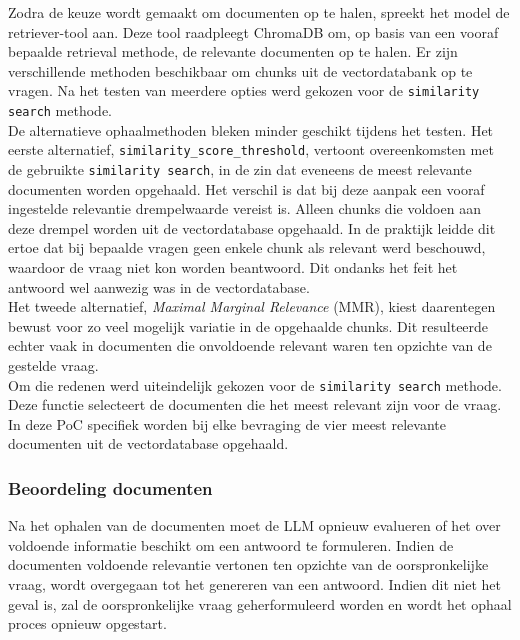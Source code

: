 Zodra de keuze wordt gemaakt om documenten op te halen, spreekt het model de retriever-tool aan. Deze tool raadpleegt ChromaDB om, op basis van een vooraf bepaalde retrieval methode, de relevante documenten op te halen. Er zijn verschillende methoden beschikbaar om chunks uit de vectordatabank op te vragen. Na het testen van meerdere opties werd gekozen voor de \verb|similarity search| methode.
\\[1em]
De alternatieve ophaalmethoden bleken minder geschikt tijdens het testen. Het eerste alternatief, \verb|similarity_score_threshold|, vertoont overeenkomsten met de gebruikte \verb|similarity search|, in de zin dat eveneens de meest relevante documenten worden opgehaald. Het verschil is dat bij deze aanpak een vooraf ingestelde relevantie drempelwaarde vereist is. Alleen chunks die voldoen aan deze drempel worden uit de vectordatabase opgehaald. In de praktijk leidde dit ertoe dat bij bepaalde vragen geen enkele chunk als relevant werd beschouwd, waardoor de vraag niet kon worden beantwoord. Dit ondanks het feit het antwoord wel aanwezig was in de vectordatabase.  
\\[1em]
Het tweede alternatief, \textit{Maximal Marginal Relevance} (MMR), kiest daarentegen bewust voor zo veel mogelijk variatie in de opgehaalde chunks. Dit resulteerde echter vaak in documenten die onvoldoende relevant waren ten opzichte van de gestelde vraag.  
\\[1em]
Om die redenen werd uiteindelijk gekozen voor de \verb|similarity search| methode. Deze functie selecteert de documenten die het meest relevant zijn voor de vraag. In deze PoC specifiek worden bij elke bevraging de vier meest relevante documenten uit de vectordatabase opgehaald.

\subsubsection{Beoordeling documenten}

Na het ophalen van de documenten moet de LLM opnieuw evalueren of het over voldoende informatie beschikt om een antwoord te formuleren. Indien de documenten voldoende relevantie vertonen ten opzichte van de oorspronkelijke vraag, wordt overgegaan tot het genereren van een antwoord. Indien dit niet het geval is, zal de oorspronkelijke vraag geherformuleerd worden en wordt het ophaal proces opnieuw opgestart.

